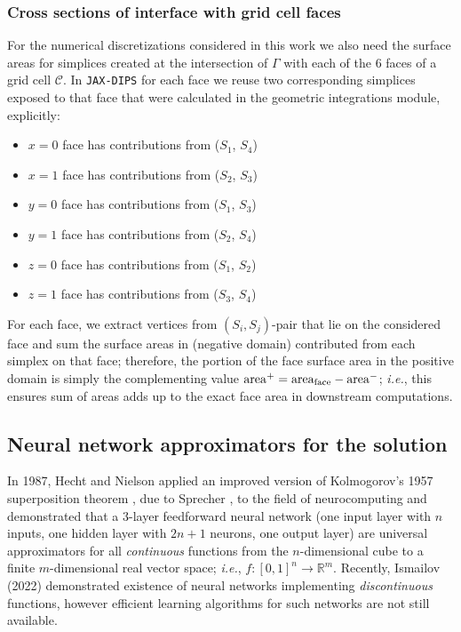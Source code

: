 \documentclass{elsarticle}
\begin{document}
\subsubsection{Cross sections of interface with grid cell faces}
For the numerical discretizations considered in this work we also need the surface areas for simplices created at the intersection of $\Gamma$ with each of the 6 faces of a grid cell $\mathcal{C}$. In \texttt{JAX-DIPS} for each face we reuse two corresponding simplices exposed to that face that were calculated in the geometric integrations module, explicitly: 
\begin{itemize}
	\item $x=0$ face has contributions from ($S_1$, $S_4$)
	\item $x=1$ face has contributions from ($S_2$, $S_3$)
	\item $y=0$ face has contributions from ($S_1$, $S_3$)
	\item $y=1$ face has contributions from ($S_2$, $S_4$)
	\item $z=0$ face has contributions from ($S_1$, $S_2$)
	\item $z=1$ face has contributions from ($S_3$, $S_4$)
\end{itemize}
For each face, we extract vertices from $(S_i,S_j)$-pair that lie on the considered face and sum the surface areas in (negative domain) contributed from each simplex on that face; therefore, the portion of the face surface area in the positive domain is simply the complementing value $\rm area^+=area_{face}-area^-$; \textit{i.e.}, this ensures sum of areas adds up to the exact face area in downstream computations.





\subsection{Neural network approximators for the solution}

In 1987, Hecht and Nielson \cite{hecht1987kolmogorov} applied an improved version of Kolmogorov's 1957 superposition theorem \cite{kolmogorov1957representation}, due to Sprecher \cite{sprecher1965structure}, to the field of neurocomputing and demonstrated that a $3$-layer feedforward neural network (one input layer with $n$ inputs, one hidden layer with $2n+1$ neurons, one output layer) are universal approximators for all \textit{continuous} functions from the $n$-dimensional cube to a finite $m$-dimensional real vector space; \textit{i.e.}, $f: [0,1]^n \rightarrow \mathbb{R}^m $. Recently, Ismailov (2022) \cite{ismailov2022} demonstrated existence of neural networks implementing \textit{discontinuous} functions, however efficient learning algorithms for such networks are not still available. 
\end{document}
